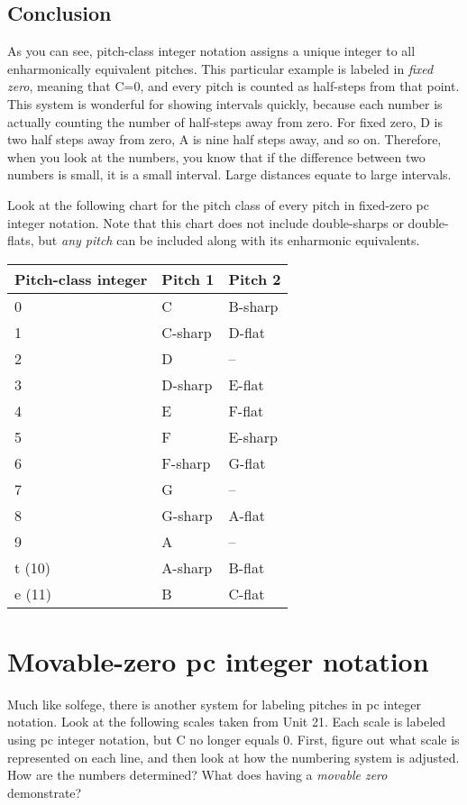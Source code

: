 \documentclass{book}
\begin{document}
\hypertarget{conclusion-12}{%
\subsection{Conclusion}\label{conclusion-12}}

As you can see, pitch-class integer notation assigns a unique integer to all
enharmonically equivalent pitches. This particular example is labeled in
\emph{fixed zero}, meaning that C=0, and every pitch is counted as half-steps
from that point. This system is wonderful for showing intervals quickly,
because each number is actually counting the number of half-steps away from
zero. For fixed zero, D is two half steps away from zero, A is nine half steps
away, and so on. Therefore, when you look at the numbers, you know that if the
difference between two numbers is small, it is a small interval. Large
distances equate to large intervals.

Look at the following chart for the pitch class of every pitch in fixed-zero
pc integer notation. Note that this chart does not include double-sharps or
double-flats, but \emph{any pitch} can be included along with its enharmonic
equivalents.

\begin{longtable}[]{@{}lll@{}}
\toprule
Pitch-class integer & Pitch 1 & Pitch 2 \\
\midrule
\endhead
0 & C & B-sharp \\
1 & C-sharp & D-flat \\
2 & D & -- \\
3 & D-sharp & E-flat \\
4 & E & F-flat \\
5 & F & E-sharp \\
6 & F-sharp & G-flat \\
7 & G & -- \\
8 & G-sharp & A-flat \\
9 & A & -- \\
t (10) & A-sharp & B-flat \\
e (11) & B & C-flat \\
\bottomrule
\end{longtable}

\hypertarget{movable-zero-pc-integer-notation}{%
\section{Movable-zero pc integer
notation}\label{movable-zero-pc-integer-notation}}

Much like solfege, there is another system for labeling pitches in pc integer
notation. Look at the following scales taken from Unit 21. Each scale is
labeled using pc integer notation, but C no longer equals 0. First, figure out
what scale is represented on each line, and then look at how the numbering
system is adjusted. How are the numbers determined? What does having a
\emph{movable zero} demonstrate?
\end{document}
